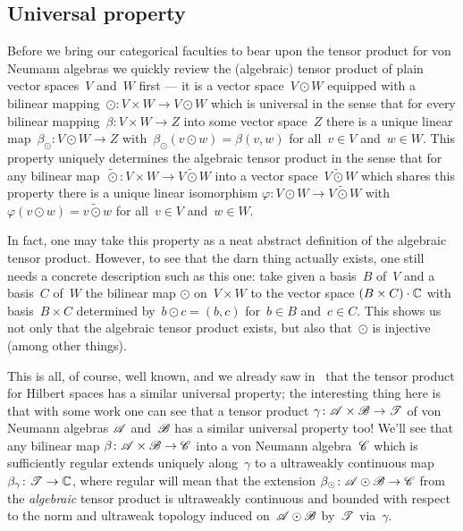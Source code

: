 \documentclass[a]{subfiles}
\begin{document}
\subsection{Universal property}
\begin{parsec}%
\begin{point}%
Before we bring our categorical faculties
to bear upon the tensor product for von Neumann algebras
we quickly review
the (algebraic)
tensor product of plain vector spaces~$V$ and~$W$ first ---
it is a vector space~$V\odot W$
equipped
with a bilinear mapping~$\odot\colon V\times W\to V\odot W$
which is  universal  
in the sense that for every bilinear mapping~$\beta\colon V\times W\to Z$
into some vector space~$Z$
there is a unique linear map~$\beta_\odot\colon V\odot W\to Z$
with~$\beta_\odot(v\odot w)=\beta(v,w)$
for all~$v\in V$ and~$w\in W$.
This property
uniquely determines the algebraic tensor product in the sense
that for any bilinear map~$\mathbin{\tilde\odot}\colon
 V\times W\to V\mathbin{\tilde\odot} W$
 into a vector space~$V\mathbin{\tilde \odot} W$
which shares this property
there is a unique linear isomorphism $\varphi\colon V\odot W\to V
\mathbin{\tilde \odot} W$
with $\varphi(v\odot w) = v\mathbin{\tilde\odot} w$
for all~$v\in V$ and~$w\in W$.

In fact, one may take this property as a neat abstract 
definition of the algebraic
tensor product.
However, to  see that the darn thing actually exists,
one still needs a concrete description
such as this one:
take given a basis~$B$ of~$V$ and a basis~$C$ of~$W$
the bilinear map $\odot$ on~$V\times W$
to the vector space $(B\times C)\cdot \mathbb{C}$ with basis~$B\times C$
determined by~$b\odot c = (b,c)$
for~$b\in B$ and~$c\in C$.
This shows us not only that the algebraic tensor product
exists,
but also 
that~$\odot$ is injective (among other things).

This is all, of course, well known,
and we already saw in~
that the tensor product for Hilbert spaces
has a similar universal property;
the interesting thing here is that
with some work one can see that
a tensor product
$\gamma\colon \mathscr{A}\times \mathscr{B}\to \mathscr{T}$
of von Neumann algebras
$\mathscr{A}$ and~$\mathscr{B}$
has a similar universal property too!
We'll see that any bilinear map $\beta\colon \mathscr{A}\times \mathscr{B}\to\mathscr{C}$
into a von Neumann algebra~$\mathscr{C}$
which is sufficiently regular
extends uniquely along~$\gamma$ to a ultraweakly continuous
map $\beta_\gamma \colon  \mathscr{T}\to\mathbb{C}$,
where regular will mean 
that the extension $\beta_\odot\colon \mathscr{A}\odot\mathscr{B}\to\mathscr{C}$
from the \emph{algebraic} tensor product
is ultraweakly continuous
and bounded
with respect to the norm and ultraweak topology
induced on~$\mathscr{A}\odot\mathscr{B}$ by~$\mathscr{T}$
via~$\gamma$.


\end{point}
\end{parsec}
\end{document}
